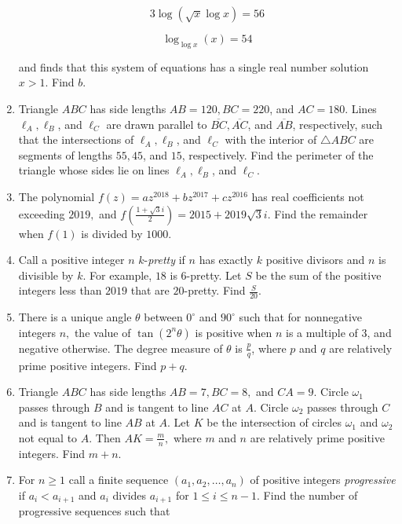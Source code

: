 \documentclass{article}
\begin{document}
\begin{enumerate}[label=\arabic*., itemsep=0.5em]
\begin{equation*}
3\log(\sqrt{x}\log x)=56
\end{equation*}


\begin{equation*}
\log_{\log x}(x)=54
\end{equation*}

and finds that this system of equations has a single real number solution \(x>1\). Find \(b\).\par \vspace{0.5em}\item Triangle \(ABC\) has side lengths \(AB=120,BC=220\), and \(AC=180\). Lines \(\ell_A,\ell_B\), and \(\ell_C\) are drawn parallel to \(\overline{BC},\overline{AC}\), and \(\overline{AB}\), respectively, such that the intersections of \(\ell_A,\ell_B\), and \(\ell_C\) with the interior of \(\triangle ABC\) are segments of lengths \(55,45\), and \(15\), respectively. Find the perimeter of the triangle whose sides lie on lines \(\ell_A,\ell_B\), and \(\ell_C\).\par \vspace{0.5em}\item The polynomial \(f(z)=az^{2018}+bz^{2017}+cz^{2016}\) has real coefficients not exceeding \(2019,\) and \(f\left(\tfrac{1+\sqrt3i}{2}\right)=2015+2019\sqrt3i\). Find the remainder when \(f(1)\) is divided by \(1000\).\par \vspace{0.5em}\item Call a positive integer \(n\) \(k\)-\textit{pretty} if \(n\) has exactly \(k\) positive divisors and \(n\) is divisible by \(k\). For example, \(18\) is \(6\)-pretty. Let \(S\) be the sum of the positive integers less than \(2019\) that are \(20\)-pretty. Find \(\tfrac{S}{20}\).\par \vspace{0.5em}\item There is a unique angle \(\theta\) between \(0^\circ\) and \(90^\circ\) such that for nonnegative integers \(n,\) the value of \(\tan(2^n\theta)\) is positive when \(n\) is a multiple of \(3\), and negative otherwise. The degree measure of \(\theta\) is \(\tfrac{p}{q}\), where \(p\) and \(q\) are relatively prime positive integers. Find \(p+q\).\par \vspace{0.5em}\item Triangle \(ABC\) has side lengths \(AB=7,BC=8,\) and \(CA=9.\) Circle \(\omega_1\) passes through \(B\) and is tangent to line \(AC\) at \(A.\) Circle \(\omega_2\) passes through \(C\) and is tangent to line \(AB\) at \(A.\) Let \(K\) be the intersection of circles \(\omega_1\) and \(\omega_2\) not equal to \(A.\) Then \(AK=\tfrac{m}{n},\) where \(m\) and \(n\) are relatively prime positive integers. Find \(m+n.\)\par \vspace{0.5em}\item For \(n\ge1\) call a finite sequence \((a_1,a_2,\ldots,a_n)\) of positive integers \textit{progressive} if \(a_i<a_{i+1}\) and \(a_i\) divides \(a_{i+1}\) for \(1\le i\le n-1\). Find the number of progressive sequences such that 
\end{enumerate}
\end{document}
